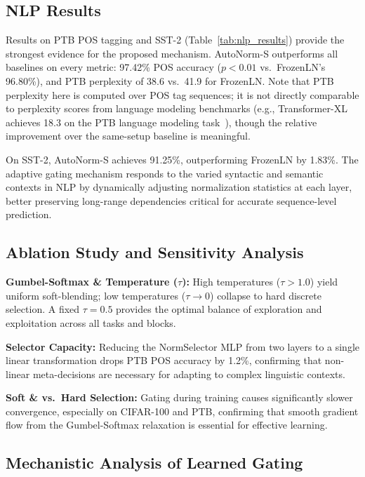 \documentclass[final,3p,times,twocolumn]{elsarticle}
\begin{document}
\subsection{NLP Results}
\label{sec:nlp}

Results on PTB POS tagging and SST-2
(Table~\ref{tab:nlp_results}) provide the strongest evidence for the
proposed mechanism. AutoNorm-S outperforms all baselines on every
metric: 97.42\% POS accuracy ($p < 0.01$ vs.\ FrozenLN's 96.80\%),
and PTB perplexity of 38.6 vs.\ 41.9 for FrozenLN. Note that PTB
perplexity here is computed over POS tag sequences; it is not
directly comparable to perplexity scores from language modeling
benchmarks (e.g., Transformer-XL achieves 18.3 on the PTB language
modeling task~\cite{dai2019transformerxl}), though the relative
improvement over the same-setup baseline is meaningful.

On SST-2, AutoNorm-S achieves 91.25\%, outperforming FrozenLN by
1.83\%. The adaptive gating mechanism responds to the varied syntactic
and semantic contexts in NLP by dynamically adjusting normalization
statistics at each layer, better preserving long-range dependencies
critical for accurate sequence-level prediction.

\subsection{Ablation Study and Sensitivity Analysis}

\textbf{Gumbel-Softmax & Temperature ($\tau$):} High temperatures
($\tau > 1.0$) yield uniform soft-blending; low temperatures
($\tau \to 0$) collapse to hard discrete selection. A fixed
$\tau = 0.5$ provides the optimal balance of exploration and
exploitation across all tasks and blocks.

\textbf{Selector Capacity:} Reducing the NormSelector MLP from two
layers to a single linear transformation drops PTB POS accuracy by
1.2\%, confirming that non-linear meta-decisions are necessary for
adapting to complex linguistic contexts.

\textbf{Soft & vs.\ Hard Selection:} Gating
during training causes significantly slower convergence,
especially on CIFAR-100 and PTB, confirming that smooth gradient flow
from the Gumbel-Softmax relaxation is essential for effective learning.

\subsection{Mechanistic Analysis of Learned Gating}
\end{document}

